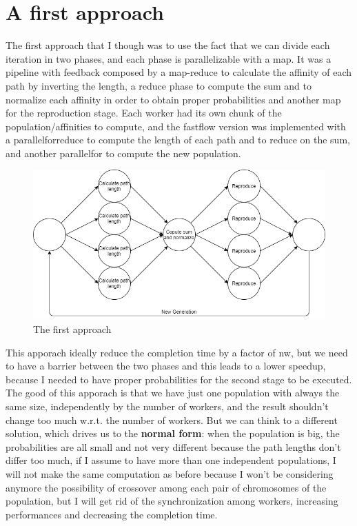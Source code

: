 \documentclass{article}
\begin{document}
    \section{A first approach}\label{sec:s2}
	The first approach that I though was to use the fact that we can divide each iteration in two phases, and each phase is parallelizable with a map. It was a pipeline with feedback composed by a map-reduce to calculate the affinity of each path by inverting the length, a reduce phase to compute the sum and to normalize each affinity in order to obtain proper probabilities and another map for the reproduction stage. Each worker had its own chunk of the population/affinities to compute, and the fastflow version was implemented with a parallelforreduce to compute the length of each path and to reduce on the sum, and another parallelfor to compute the new population.
    \begin{figure}
        \includegraphics[width=\linewidth]{img/first.png}
        \caption{The first approach}
        \label{fig:first}
    \end{figure}
    This apporach ideally reduce the completion time by a factor of nw, but we need to have a barrier between the two phases and this leads to a lower speedup, because I needed to have proper probabilities for the second stage to be executed. The good of this apporach is that we have just one population with always the same size, independently by the number of workers, and the result shouldn't change too much w.r.t. the number of workers. But we can think to a different solution, which drives us to the \textbf{normal form}: when the population is big, the probabilities are all small and not very different because the path lengths don't differ too much, if I assume to have more than one independent populations, I will not make the same computation as before because I won't be considering anymore the possibility of crossover among each pair of chromosomes of the population, but I will get rid of the synchronization among workers, increasing performances and decreasing the completion time.
\end{document}
